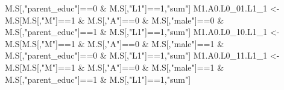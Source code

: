 \documentclass[
]{book}
\newenvironment{Shaded}{\begin{snugshade}}{\end{snugshade}}
\newcommand{\DecValTok}[1]{\textcolor[rgb]{0.00,0.00,0.81}{#1}}
\newcommand{\NormalTok}[1]{#1}
\newcommand{\OtherTok}[1]{\textcolor[rgb]{0.56,0.35,0.01}{#1}}
\newcommand{\SpecialCharTok}[1]{\textcolor[rgb]{0.00,0.00,0.00}{#1}}
\newcommand{\StringTok}[1]{\textcolor[rgb]{0.31,0.60,0.02}{#1}}
\begin{document}
\begin{Shaded}
\begin{Highlighting}[]
\NormalTok{                            M.S[,}\StringTok{"parent\_educ"}\NormalTok{]}\SpecialCharTok{==}\DecValTok{0} \SpecialCharTok{\&}\NormalTok{ M.S[,}\StringTok{"L1"}\NormalTok{]}\SpecialCharTok{==}\DecValTok{1}\NormalTok{,}\StringTok{"sum"}\NormalTok{]}
\NormalTok{  M1.A0.L0\_01.L1\_1 }\OtherTok{\textless{}{-}}\NormalTok{ M.S[M.S[,}\StringTok{"M"}\NormalTok{]}\SpecialCharTok{==}\DecValTok{1} \SpecialCharTok{\&}\NormalTok{ M.S[,}\StringTok{"A"}\NormalTok{]}\SpecialCharTok{==}\DecValTok{0} \SpecialCharTok{\&}\NormalTok{ M.S[,}\StringTok{"male"}\NormalTok{]}\SpecialCharTok{==}\DecValTok{0} \SpecialCharTok{\&} 
\NormalTok{                            M.S[,}\StringTok{"parent\_educ"}\NormalTok{]}\SpecialCharTok{==}\DecValTok{1} \SpecialCharTok{\&}\NormalTok{ M.S[,}\StringTok{"L1"}\NormalTok{]}\SpecialCharTok{==}\DecValTok{1}\NormalTok{,}\StringTok{"sum"}\NormalTok{]}
\NormalTok{  M1.A0.L0\_10.L1\_1 }\OtherTok{\textless{}{-}}\NormalTok{ M.S[M.S[,}\StringTok{"M"}\NormalTok{]}\SpecialCharTok{==}\DecValTok{1} \SpecialCharTok{\&}\NormalTok{ M.S[,}\StringTok{"A"}\NormalTok{]}\SpecialCharTok{==}\DecValTok{0} \SpecialCharTok{\&}\NormalTok{ M.S[,}\StringTok{"male"}\NormalTok{]}\SpecialCharTok{==}\DecValTok{1} \SpecialCharTok{\&} 
\NormalTok{                            M.S[,}\StringTok{"parent\_educ"}\NormalTok{]}\SpecialCharTok{==}\DecValTok{0} \SpecialCharTok{\&}\NormalTok{ M.S[,}\StringTok{"L1"}\NormalTok{]}\SpecialCharTok{==}\DecValTok{1}\NormalTok{,}\StringTok{"sum"}\NormalTok{]}
\NormalTok{  M1.A0.L0\_11.L1\_1 }\OtherTok{\textless{}{-}}\NormalTok{ M.S[M.S[,}\StringTok{"M"}\NormalTok{]}\SpecialCharTok{==}\DecValTok{1} \SpecialCharTok{\&}\NormalTok{ M.S[,}\StringTok{"A"}\NormalTok{]}\SpecialCharTok{==}\DecValTok{0} \SpecialCharTok{\&}\NormalTok{ M.S[,}\StringTok{"male"}\NormalTok{]}\SpecialCharTok{==}\DecValTok{1} \SpecialCharTok{\&} 
\NormalTok{                            M.S[,}\StringTok{"parent\_educ"}\NormalTok{]}\SpecialCharTok{==}\DecValTok{1} \SpecialCharTok{\&}\NormalTok{ M.S[,}\StringTok{"L1"}\NormalTok{]}\SpecialCharTok{==}\DecValTok{1}\NormalTok{,}\StringTok{"sum"}\NormalTok{]}
  

\end{Highlighting}
\end{Shaded}
\end{document}
